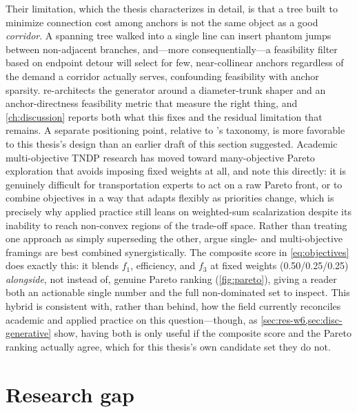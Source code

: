 Their limitation, which the thesis characterizes in detail, is that a tree built to
minimize connection cost among anchors is not the same object as a good \emph{corridor}.
A spanning tree walked into a single line can insert phantom jumps between non-adjacent
branches, and---more consequentially---a feasibility filter based on endpoint detour will
select for few, near-collinear anchors regardless of the demand a corridor actually
serves, confounding feasibility with anchor sparsity.  re-architects the
generator around a diameter-trunk shaper and an anchor-directness feasibility metric that
measure the right thing, and \cref{ch:discussion} reports both what this fixes and the
residual limitation that remains. A separate positioning point, relative to
\textcite{kepaptsoglou2009review}'s taxonomy, is more favorable to this thesis's design
than an earlier draft of this section suggested. Academic multi-objective TNDP research
has moved toward many-objective Pareto exploration that avoids imposing fixed weights at
all, and \textcite{silva2022mo} note this directly: it is genuinely difficult for
transportation experts to act on a raw Pareto front, or to combine objectives in a way
that adapts flexibly as priorities change, which is precisely why applied practice still
leans on weighted-sum scalarization despite its inability to reach non-convex regions of
the trade-off space. Rather than treating one approach as simply superseding the other,
\textcite{silva2022mo} argue single- and multi-objective framings are best combined
synergistically. The composite score in \cref{eq:objectives} does exactly this: it blends
$f_1$, efficiency, and $f_3$ at fixed weights (0.50/0.25/0.25) \emph{alongside}, not
instead of, genuine Pareto ranking (\cref{fig:pareto}), giving a reader both an
actionable single number and the full non-dominated set to inspect. This hybrid is
consistent with, rather than behind, how the field currently reconciles academic and
applied practice on this question---though, as \cref{sec:res-w6,sec:disc-generative}
show, having both is only useful if the composite score and the Pareto ranking actually
agree, which for this thesis's own candidate set they do not.

\section{Research gap}
\label{sec:lit-gap}

